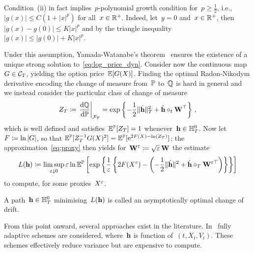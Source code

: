 \begin{remark}
Condition~(ii) in fact implies~$p$-polynomial growth condition for~$p\geq\frac{1}{2}$, i.e.,~$|g(x)|\leq C(1 + |x|^p)$ for all~$x\in\mathbb{R}^+$. Indeed, let~$y=0$ and~$x\in\mathbb{R}^+$, then~$|g(x)-g(0)|\leq K|x|^p$ and by the triangle inequality~$|g(x)|\leq|g(0)|+K|x|^p$.
\end{remark}
Under this assumption,
Yamada-Watanabe's theorem~\cite[Theorem 1]{Yamada1971OnEquations} ensures the existence of 
a unique strong solution to~\eqref{eq:log_price_dyn}.
Consider now the continuous map
$G\in\mathcal{C}_T$, 
yielding the option price~$\mathbb{E}[G(X)]$.
Finding the optimal Radon-Nikodym derivative encoding the change of measure from~$\mathbb{P}$ to~$\mathbb{Q}$ is hard in general and we instead consider the particular class of change of measure
\begin{equation}\label{eq:ZRadon}
Z_T\coloneqq \left.\frac{\mathrm{d} \mathbb{Q}}{\mathrm{d} \mathbb{P}}\right\vert_{\mathcal{F}_T} = \exp\left\{-\frac{1}{2}\|\dot{\boldsymbol{\mathrm{h}}}\|_{T}^2 + \dot{\boldsymbol{\mathrm{h}}}\circ_{t} \boldsymbol{\mathrm{W}}^\top \right\}\,,
\end{equation}
which is well defined and satisfies~$\mathbb{E}^{\mathbb{P}}[Z_T]=1$
whenever~$\boldsymbol{\mathrm{h}} \in \mathbb{H}^0_T$.
Now let~$F \coloneqq \ln|G|$, so that
$\mathbb{E}^{\mathbb{P}}[Z_T^{-1} G(X)^2] = \mathbb{E}^{\mathbb{P}}[\mathrm{e}^{2F(X) - \ln(Z_T)}]$; 
the approximation~\eqref{eq:proxy} then yields for~$\boldsymbol{\mathrm{W}}^\varepsilon\coloneqq\sqrt{\varepsilon}\,\boldsymbol{\mathrm{W}}$ the estimate
\begin{equation}\label{eq:MinProblem}
L(\boldsymbol{\mathrm{h}})\coloneqq\limsup_{\varepsilon\downarrow 0}\varepsilon\ln\mathbb{E}^{\mathbb{P}}\left[\exp\left\{\frac{1}{\varepsilon}\left\{2F(X^\varepsilon) - \left(-\frac{1}{2}\|\dot{\boldsymbol{\mathrm{h}}}\|^2 + \dot{\boldsymbol{\mathrm{h}}}\circ_T\boldsymbol{\mathrm{W}}^{\varepsilon\top}\right)\right\}\right\}\right]
\end{equation}
to compute, for some proxies~$X^\varepsilon$.
\begin{definition}\label{def:asyoptdrift}
A path~$\boldsymbol{\mathrm{h}}\in \mathbb{H}_T^0$ 
minimising~$L(\boldsymbol{\mathrm{h}})$
is called an asymptotically optimal change of drift.
\end{definition}
From this point onward, several approaches exist in the literature. In~\cite{Dupuis2012ImportanceDiffusions, Hartmann2018ImportanceVariables, Dupuis2017ModerateEquations} fully adaptive schemes are considered, where~$\boldsymbol{\mathrm{h}}$ is function of~$(t, X_t, V_t)$. These schemes effectively reduce variance but are expensive to compute. 
